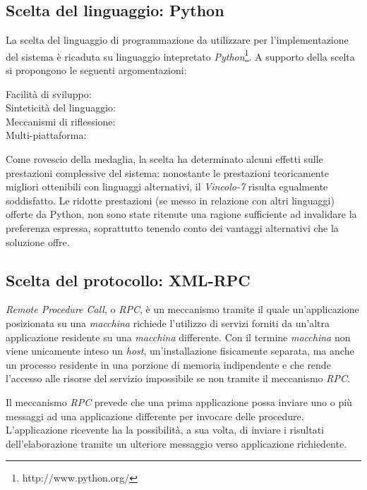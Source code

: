 \subsection{Scelta del linguaggio: Python}
La scelta del linguaggio di programmazione da utilizzare per l'implementazione del sistema è ricaduta su linguaggio intepretato \emph{Python}\footnote{http://www.python.org/}. A supporto della scelta si propongono le seguenti argomentazioni:
\begin{description}
	\item[Facilità di sviluppo:]
	
	\item[Sinteticità del linguaggio:]
	
	\item[Meccanismi di riflessione:]
	
	\item[Multi-piattaforma:]
	
\end{description}

Come rovescio della medaglia, la scelta ha determinato alcuni effetti sulle prestazioni complessive del sistema: nonostante le prestazioni teoricamente migliori ottenibili con linguaggi alternativi, il \emph{Vincolo-7} risulta egualmente soddisfatto. Le ridotte prestazioni (se messo in relazione con altri linguaggi) offerte da Python, non sono state ritenute una ragione sufficiente ad invalidare la preferenza espressa, soprattutto tenendo conto dei vantaggi alternativi che la soluzione offre.

\subsection{Scelta del protocollo: XML-RPC}

\emph{Remote Procedure Call}, o \emph{RPC}, è un meccanismo tramite il quale un'applicazione posizionata su una \emph{macchina} richiede l'utilizzo di servizi forniti da un'altra applicazione residente su una \emph{macchina} differente. Con il termine \emph{macchina} non viene unicamente inteso un \emph{host}, un'installazione fisicamente separata, ma anche un processo residente in una porzione di memoria indipendente e che rende l'accesso alle risorse del servizio impossibile se non tramite il meccanismo \emph{RPC}. 

Il meccanismo \emph{RPC} prevede che una prima applicazione possa inviare uno o più messaggi ad una applicazione differente per invocare delle procedure. L'applicazione ricevente ha la possibilità,  a sua volta, di inviare i risultati dell'elaborazione tramite un ulteriore messaggio verso applicazione richiedente.~\cite{MERRICK:2006:misc}

